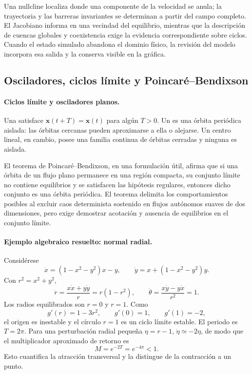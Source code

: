 \begin{warningbox}
Una nullcline localiza donde una componente de la velocidad se anula; la trayectoria y
las barreras invariantes se determinan a partir del campo completo. El Jacobiano informa
en una vecindad del equilibrio, mientras que la descripción de cuencas globales y coexistencia exige
la evidencia correspondiente sobre ciclos. Cuando el estado simulado abandona el dominio físico,
la revisión del modelo incorpora esa salida y la conserva visible en la gráfica.
\end{warningbox}


\subsection{Osciladores, ciclos límite y Poincaré--Bendixson}

\paragraph{Ciclos límite y osciladores planos.}
Una  satisface
\(\mathbf x(t+T)=\mathbf x(t)\) para algún \(T>0\). Un  es una
órbita periódica aislada: las órbitas cercanas pueden aproximarse a ella o alejarse.
Un centro lineal, en cambio, posee una familia continua de órbitas cerradas y ninguna
es aislada.

El teorema de Poincaré--Bendixson, en una formulación útil, afirma que si una órbita
de un flujo plano permanece en una región compacta, su conjunto límite no contiene
equilibrios y se satisfacen las hipótesis regulares, entonces dicho conjunto es una
órbita periódica. El teorema delimita los comportamientos posibles al excluir caos determinista sostenido
en flujos autónomos suaves de dos dimensiones, pero exige demostrar acotación y
ausencia de equilibrios en el conjunto límite.

\paragraph{Ejemplo algebraico resuelto: normal radial.}
Considérese
\[
 \dot x=(1-x^2-y^2)x-y,\qquad
 \dot y=x+(1-x^2-y^2)y.
\]
Con \(r^2=x^2+y^2\),
\[
 \dot r=\frac{x\dot x+y\dot y}{r}=r(1-r^2),\qquad
 \dot\theta=\frac{x\dot y-y\dot x}{r^2}=1.
\]
Los radios equilibrados son \(r=0\) y \(r=1\). Como
\[
 g'(r)=1-3r^2,\qquad g'(0)=1,\qquad g'(1)=-2,
\]
el origen es inestable y el círculo \(r=1\) es un ciclo límite estable. El periodo es
\(T=2\pi\). Para una perturbación radial pequeña \(\eta=r-1\),
\(\dot\eta\simeq-2\eta\), de modo que el multiplicador aproximado de retorno es
\[
 M=e^{-2T}=e^{-4\pi}<1.
\]
Esto cuantifica la atracción transversal y la distingue de la contracción a un punto.

